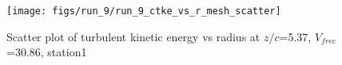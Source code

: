 \begin{figure}[H]
\centering
\texttt{[image: figs/run\_9/run\_9\_ctke\_vs\_r\_mesh\_scatter]}
\caption{Scatter plot of turbulent kinetic energy vs radius at $z/c$=5.37, $V_{free}$=30.86, station1}
\label{fig:run_9_ctke_vs_r_mesh_scatter}
\end{figure}


